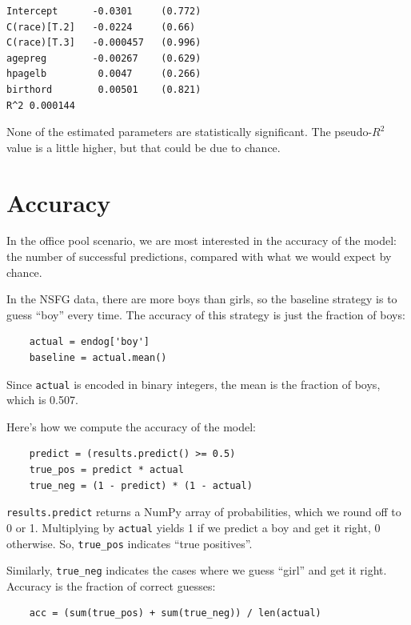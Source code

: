 \documentclass[12pt]{book}
\begin{document}
\begin{verbatim}
Intercept      -0.0301     (0.772)
C(race)[T.2]   -0.0224     (0.66)
C(race)[T.3]   -0.000457   (0.996)
agepreg        -0.00267    (0.629)
hpagelb         0.0047     (0.266)
birthord        0.00501    (0.821)
R^2 0.000144
\end{verbatim}

None of the estimated parameters are statistically significant.  The
pseudo-$R^2$ value is a little higher, but that could be due to
chance.
   


\section{Accuracy}
\label{accuracy}

In the office pool scenario,
we are most interested in the accuracy of the model:
the number of successful predictions, compared with what we would
expect by chance.

In the NSFG data, there are more boys than girls, so the baseline
strategy is to guess ``boy'' every time.  The accuracy of this
strategy is just the fraction of boys:

\begin{verbatim}
    actual = endog['boy']
    baseline = actual.mean()
\end{verbatim}

Since \verb"actual" is encoded in binary integers, the mean is the
fraction of boys, which is 0.507.

Here's how we compute the accuracy of the model:

\begin{verbatim}
    predict = (results.predict() >= 0.5)
    true_pos = predict * actual
    true_neg = (1 - predict) * (1 - actual)
\end{verbatim}

\verb"results.predict" returns a NumPy array of probabilities, which we
round off to 0 or 1.  Multiplying by \verb"actual"
yields 1 if we predict a boy and get it right, 0 otherwise.  So,
\verb"true_pos" indicates ``true positives''.

Similarly, \verb"true_neg" indicates the cases where we guess ``girl''
and get it right.  Accuracy is the fraction of correct guesses:

\begin{verbatim}
    acc = (sum(true_pos) + sum(true_neg)) / len(actual)
\end{verbatim}
\end{document}
